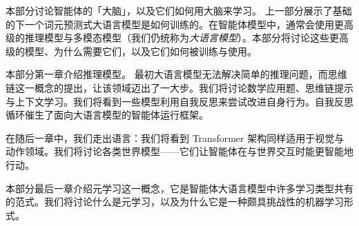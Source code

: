 本部分讨论智能体的「大脑」，以及它们如何用大脑来学习。  
上一部分展示了基础的下一个词元预测式大语言模型是如何训练的。在智能体模型中，通常会使用更高级的推理模型与多模态模型（我们仍统称为{\em 大语言模型}）。本部分将讨论这些更高级的模型、为什么需要它们，以及它们如何被训练与使用。  

本部分第一章介绍推理模型。  
最初大语言模型无法解决简单的推理问题，而思维链这一概念的提出，让该领域迈出了一大步。我们将讨论数学应用题、思维链提示与上下文学习。我们将看到一些模型利用自我反思来尝试改进自身行为。自我反思循环催生了面向大语言模型的智能体运行框架。  

在随后一章中，我们走出语言：我们将看到 Transformer 架构同样适用于视觉与动作领域。我们将讨论各类世界模型——它们让智能体在与世界交互时能更智能地行动。  

本部分最后一章介绍元学习这一概念，它是智能体大语言模型中许多学习类型共有的范式。我们将讨论什么是元学习，以及为什么它是一种颇具挑战性的机器学习形式。
